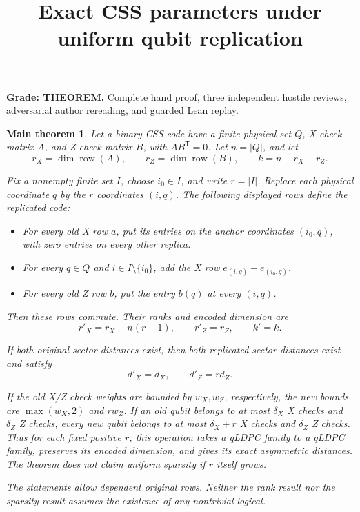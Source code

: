 \documentclass{article}
\title{Exact CSS parameters under uniform qubit replication}
\author{}
\date{}
\newtheorem*{maintheorem}{Main theorem}
\DeclareMathOperator{\rowsp}{row}
\begin{document}
\maketitle

\textbf{Grade: THEOREM.} Complete hand proof, three independent hostile reviews,
adversarial author rereading, and guarded Lean replay.

\begin{maintheorem}\label{thm:main}
Let a binary CSS code have a finite physical set \(Q\), X-check matrix \(A\),
and Z-check matrix \(B\), with \(AB^{\mathsf T}=0\). Let \(n=|Q|\), and let
\begin{equation}\label{eq:old-params}
r_X=\dim\rowsp(A),\qquad
r_Z=\dim\rowsp(B),\qquad k=n-r_X-r_Z.
\end{equation}

Fix a nonempty finite set \(I\), choose \(i_0\in I\), and write \(r=|I|\).
Replace each physical coordinate \(q\) by the \(r\) coordinates \((i,q)\).
The following displayed rows define the replicated code:
\begin{itemize}
\item For every old X row \(a\), put its entries on the anchor coordinates
  \((i_0,q)\), with zero entries on every other replica.
\item For every \(q\in Q\) and \(i\in I\setminus\{i_0\}\), add the X row
  \(e_{(i,q)}+e_{(i_0,q)}\).
\item For every old Z row \(b\), put the entry \(b(q)\) at every \((i,q)\).
\end{itemize}

Then these rows commute. Their ranks and encoded dimension are
\begin{equation}\label{eq:new-params}
r'_X=r_X+n(r-1),\qquad r'_Z=r_Z,\qquad k'=k.
\end{equation}

If both original sector distances exist, then both replicated sector
distances exist and satisfy
\begin{equation}\label{eq:main-distances}
\boxed{d'_X=d_X,\qquad d'_Z=r d_Z.}
\end{equation}

If the old X/Z check weights are bounded by \(w_X,w_Z\), respectively, the
new bounds are \(\max(w_X,2)\) and \(r w_Z\). If an old qubit belongs to at
most \(\delta_X\) X checks and \(\delta_Z\) Z checks, every new qubit belongs
to at most \(\delta_X+r\) X checks and \(\delta_Z\) Z checks. Thus for each
fixed positive \(r\), this operation takes a qLDPC family to a qLDPC family,
preserves its encoded dimension, and gives its exact asymmetric distances.
The theorem does not claim uniform sparsity if \(r\) itself grows.

The statements allow dependent original rows. Neither the rank result nor
the sparsity result assumes the existence of any nontrivial logical.
\end{maintheorem}
\end{document}
